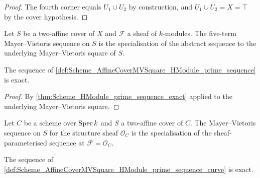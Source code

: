 \begin{proof}


\leanok
  The fourth corner equals \(U_1 \cup U_2\) by construction, and \(U_1 \cup U_2 = X = \top\) by the cover hypothesis.
\end{proof}

\begin{definition}\leanok
  \label{def:Scheme_AffineCoverMVSquare_HModule_prime_sequence}

  Let \(S\) be a two-affine cover of \(X\) and \(\mathcal F\) a sheaf of \(k\)-modules. The five-term Mayer--Vietoris sequence on \(S\) is the specialisation of the abstract sequence to the underlying Mayer--Vietoris square of \(S\).
\end{definition}

\begin{theorem}\leanok
  \label{thm:Scheme_AffineCoverMVSquare_HModule_prime_sequence_exact}

  The sequence of \cref{def:Scheme_AffineCoverMVSquare_HModule_prime_sequence} is exact.
\end{theorem}

\begin{proof}


\leanok
  By \cref{thm:Scheme_HModule_prime_sequence_exact} applied to the underlying Mayer--Vietoris square.
\end{proof}

\begin{definition}\leanok
  \label{def:Scheme_AffineCoverMVSquare_HModule_prime_sequence_curve}

  Let \(C\) be a scheme over \(\operatorname{Spec} k\) and \(S\) a two-affine cover of \(C\). The Mayer--Vietoris sequence on \(S\) for the structure sheaf \(\mathcal O_C\) is the specialisation of the sheaf-parameterised sequence at \(\mathcal F = \mathcal O_C\).
\end{definition}

\begin{theorem}\leanok
  \label{thm:Scheme_AffineCoverMVSquare_HModule_prime_sequence_curve_exact}

  The sequence of \cref{def:Scheme_AffineCoverMVSquare_HModule_prime_sequence_curve} is exact.
\end{theorem}

